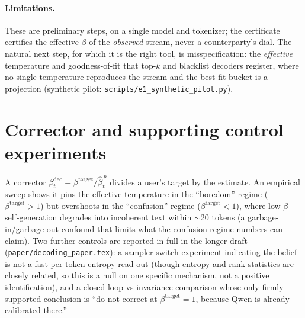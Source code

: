 \documentclass[11pt]{article}
\newcommand{\tabdir}{../results/tables}
\begin{document}
\paragraph{Limitations.}
These are preliminary steps, on a single model and tokenizer; the certificate
certifies the effective $\beta$ of the \emph{observed} stream, never a
counterparty's dial. The natural next step, for which it is the right tool, is
misspecification: the \emph{effective} temperature and goodness-of-fit that
top-$k$ and blacklist decoders register, where no single temperature reproduces
the stream and the best-fit bucket is a projection (synthetic pilot:
\texttt{scripts/e1\_synthetic\_pilot.py}).

\appendix
\section{Corrector and supporting control experiments}\label{app:controls}
A corrector $\beta^{\mathrm{dec}}_t = \beta^{\mathrm{target}}/\hat\beta_t^{\,p}$
divides a user's target by the estimate. An empirical sweep shows it pins the
effective temperature in the ``boredom'' regime ($\beta^{\mathrm{target}}>1$) but
overshoots in the ``confusion'' regime ($\beta^{\mathrm{target}}<1$), where
low-$\beta$ self-generation degrades into incoherent text within $\sim$20 tokens
(a garbage-in/garbage-out confound that limits what the confusion-regime numbers
can claim). Two further controls are reported in full in the longer draft
(\texttt{paper/decoding\_paper.tex}): a sampler-switch experiment indicating the
belief is not a fast per-token entropy read-out (though entropy and rank
statistics are closely related, so this is a null on one specific mechanism, not
a positive identification), and a closed-loop-vs-invariance comparison whose only
firmly supported conclusion is ``do not correct at $\beta^{\mathrm{target}}=1$,
because Qwen is already calibrated there.''

\begin{table}[h]
\centering\small

\caption{Beat 2, natural text (full table): the best global temperature buys
almost nothing over $\beta{=}1$ across $\scSurvNDatasets$ text types.
${}^{**}$ marks a gain significant at the stated level; magnitudes are negligible
on all real types.}
\label{tab:survey}
\end{table}



\end{document}
